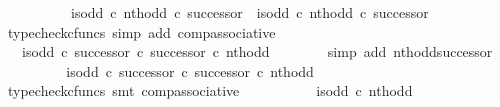 \begin{isabellebody}
\ \ \isamarkupfalse%
\ {\isacharminus}{\kern0pt}\isanewline
\ \ \ \ \isamarkupfalse%
\ {\isachardoublequoteopen}{\isacharparenleft}{\kern0pt}is{\isacharunderscore}{\kern0pt}odd\ {\isasymcirc}\isactrlsub c\ nth{\isacharunderscore}{\kern0pt}odd{\isacharparenright}{\kern0pt}\ {\isasymcirc}\isactrlsub c\ successor\ {\isacharequal}{\kern0pt}\ is{\isacharunderscore}{\kern0pt}odd\ {\isasymcirc}\isactrlsub c\ nth{\isacharunderscore}{\kern0pt}odd\ {\isasymcirc}\isactrlsub c\ successor{\isachardoublequoteclose}\isanewline
\ \ \ \ \ \ \isamarkupfalse%
\ {\isacharparenleft}{\kern0pt}typecheck{\isacharunderscore}{\kern0pt}cfuncs{\isacharcomma}{\kern0pt}\ simp\ add{\isacharcolon}{\kern0pt}\ comp{\isacharunderscore}{\kern0pt}associative{}{\isacharparenright}{\kern0pt}\isanewline
\ \ \ \ \isamarkupfalse%
\ \isamarkupfalse%
\ {\isachardoublequoteopen}{\isachardot}{\kern0pt}{\isachardot}{\kern0pt}{\isachardot}{\kern0pt}\ {\isacharequal}{\kern0pt}\ is{\isacharunderscore}{\kern0pt}odd\ {\isasymcirc}\isactrlsub c\ successor\ {\isasymcirc}\isactrlsub c\ successor\ {\isasymcirc}\isactrlsub c\ nth{\isacharunderscore}{\kern0pt}odd{\isachardoublequoteclose}\isanewline
\ \ \ \ \ \ \isamarkupfalse%
\ {\isacharparenleft}{\kern0pt}simp\ add{\isacharcolon}{\kern0pt}\ nth{\isacharunderscore}{\kern0pt}odd{\isacharunderscore}{\kern0pt}successor{}{\isacharparenright}{\kern0pt}\isanewline
\ \ \ \ \isamarkupfalse%
\ \isamarkupfalse%
\ {\isachardoublequoteopen}{\isachardot}{\kern0pt}{\isachardot}{\kern0pt}{\isachardot}{\kern0pt}\ {\isacharequal}{\kern0pt}\ {\isacharparenleft}{\kern0pt}{\isacharparenleft}{\kern0pt}is{\isacharunderscore}{\kern0pt}odd\ {\isasymcirc}\isactrlsub c\ successor{\isacharparenright}{\kern0pt}\ {\isasymcirc}\isactrlsub c\ successor{\isacharparenright}{\kern0pt}\ {\isasymcirc}\isactrlsub c\ nth{\isacharunderscore}{\kern0pt}odd{\isachardoublequoteclose}\isanewline
\ \ \ \ \ \ \isamarkupfalse%
\ {\isacharparenleft}{\kern0pt}typecheck{\isacharunderscore}{\kern0pt}cfuncs{\isacharcomma}{\kern0pt}\ smt\ comp{\isacharunderscore}{\kern0pt}associative{}{\isacharparenright}{\kern0pt}\isanewline
\ \ \ \ \isamarkupfalse%
\ \isamarkupfalse%
\ {\isachardoublequoteopen}{\isachardot}{\kern0pt}{\isachardot}{\kern0pt}{\isachardot}{\kern0pt}\ {\isacharequal}{\kern0pt}\ \ is{\isacharunderscore}{\kern0pt}odd\ {\isasymcirc}\isactrlsub c\ nth{\isacharunderscore}{\kern0pt}odd{\isachardoublequoteclose}\isanewline

\end{isabellebody}
